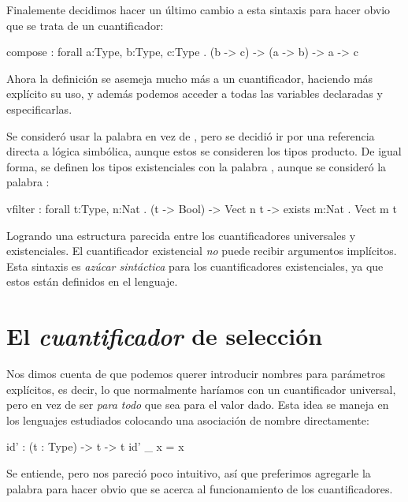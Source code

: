 {\begin{designfr}
Finalemente decidimos hacer un último cambio a esta sintaxis para hacer obvio que se trata de un cuantificador:

\begin{anglercode}
compose : forall a:Type, b:Type, c:Type . (b -> c) -> (a -> b) -> a -> c
\end{anglercode}

Ahora la definición se asemeja mucho más a un cuantificador, haciendo más explícito su uso, y además podemos acceder a todas las variables declaradas y especificarlas.

Se consideró usar la palabra  en vez de , pero se decidió ir por una referencia directa a lógica simbólica, aunque estos se consideren los tipos producto. De igual forma, se definen los tipos existenciales con la palabra , aunque se consideró la palabra :

\begin{anglercode}
vfilter : forall t:Type, n:Nat . (t -> Bool) -> Vect n t -> exists m:Nat . Vect m t
\end{anglercode}

Logrando una estructura parecida entre los cuantificadores universales y existenciales. El cuantificador existencial \emph{no} puede recibir argumentos implícitos. Esta sintaxis es \emph{azúcar sintáctica} para los cuantificadores existenciales, ya que estos están definidos en el lenguaje.
\end{designfr}

\section{El \emph{cuantificador} de selección}

\begin{designfr}
Nos dimos cuenta de que podemos querer introducir nombres para parámetros explícitos, es decir, lo que normalmente haríamos con un cuantificador universal, pero en vez de ser \emph{para todo} que sea para el valor dado. Esta idea se maneja en los lenguajes estudiados colocando una asociación de nombre directamente:

\begin{anglercode}
id' : (t : Type) -> t -> t
id' _ x = x
\end{anglercode}

Se entiende, pero nos pareció poco intuitivo, así que preferimos agregarle la palabra  para hacer obvio que se acerca al funcionamiento de los cuantificadores.


\end{designfr}}
